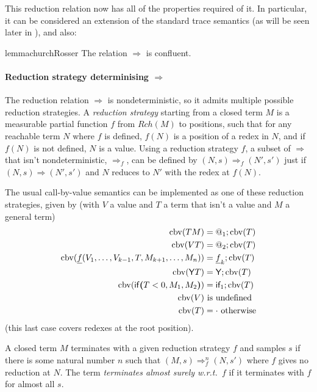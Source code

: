 \medskip
This reduction relation now has all of the properties required of it. In particular, it can be considered an extension of the standard trace semantics (as will be seen later in ), and also:
\begin{restatable}{lemma}{churchRosser} \label{churchRosser}
The relation $\Rightarrow$ is confluent.
\end{restatable}

\paragraph*{Reduction strategy determinising $\Rightarrow$}
The reduction relation $\Rightarrow$ is nondeterministic, so it admits multiple possible reduction strategies. 
A \emph{reduction strategy} starting from a closed term $M$ is a measurable partial function $f$ from $\mathit{Rch}(M)$ to positions, such that for any reachable term $N$ where $f$ is defined, $f(N)$ is a position of a redex in $N$, and if $f(N)$ is not defined, $N$ is a value.
Using a reduction strategy $f$, a subset of $\Rightarrow$ that isn't nondeterministic, $\Rightarrow_f$, can be defined by $(N,s) \Rightarrow_f (N',s')$ just if $(N,s) \Rightarrow (N',s')$ and $N$ reduces to $N'$ with the redex at $f(N)$.

The usual call-by-value semantics can be implemented as one of these reduction strategies, given by (with $V$ a value and $T$ a term that isn't a value and $M$ a general term)
\begin{align*}
\operatorname{cbv}(T M) & = @_1 ; \operatorname{cbv}(T) \\
\operatorname{cbv}(V T) & = @_2 ; \operatorname{cbv}(T) \\
\operatorname{cbv}(\underline f(V_1, \dots, V_{k-1}, T, M_{k+1}, \dots, M_n)) & = \underline f_k ; \operatorname{cbv}(T) \\
\operatorname{cbv}(\mathsf{Y} T) & = \mathsf{Y} ; \operatorname{cbv}(T) \\
\operatorname{cbv}(\mathsf{if}\boldsymbol{(}T < 0, M_1, M_2\boldsymbol{)}) & = \textsf{if}_1 ; \operatorname{cbv}(T) \\
\operatorname{cbv}(V) & \text{ is undefined} \\
\operatorname{cbv}(T) & = \cdot \text{ otherwise}
\end{align*}
(this last case covers redexes at the root position).

A closed term $M$ terminates with a given reduction strategy $f$ and samples $s$ if there is some natural number $n$ such that $(M,s) \Rightarrow_f^n (N,s')$ where $f$ gives no reduction at $N$. 
The term \emph{terminates almost surely w.r.t.~$f$} if it terminates with $f$ for almost all $s$.

